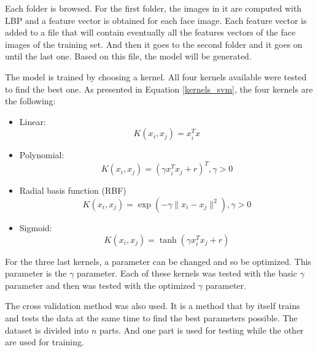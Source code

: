 \noindent Each folder is browsed. For the first folder, the images in it are computed with LBP and a feature vector is obtained for each face image. Each feature vector is added to a file that will contain eventually all the features vectors of the face images of the training set. And then it goes to the second folder and it goes on until the last one. Based on this file, the model will be generated.
\newline

\noindent The model is trained by choosing a kernel. All four kernels available were tested to find the best one. As presented in Equation \ref{kernels_svm}, the four kernels are the following:

\begin{itemize}
  \item Linear:
  \begin{equation}
K(x_i,x_j) = x_i^Tx
\end{equation}

  \item Polynomial:
  \begin{equation}
K(x_i,x_j) = (\gamma x_i^Tx_j + r)^T, \gamma > 0
\end{equation}

  \item Radial basis function (RBF)
  \begin{equation}
K(x_i,x_j) = \exp(-\gamma \| x_i - x_j \|^2), \gamma > 0
\end{equation}

  \item Sigmoid:
  \begin{equation}
K(x_i,x_j) = \tanh(\gamma x_i^T x_j + r)
\end{equation}
\end{itemize}

\vspace{\baselineskip}
\noindent For the three last kernels, a parameter can be changed and so be optimized. This parameter is the $ \gamma $ parameter. Each of these kernels was tested with the basic $ \gamma $ parameter and then was tested with the optimized $ \gamma $ parameter.
\newline

\noindent The cross validation method was also used. It is a method that by itself trains and tests the data at the same time to find the best parameters possible. The dataset is divided into $ n $ parts. And one part is used for testing while the other are used for training.
\newline






